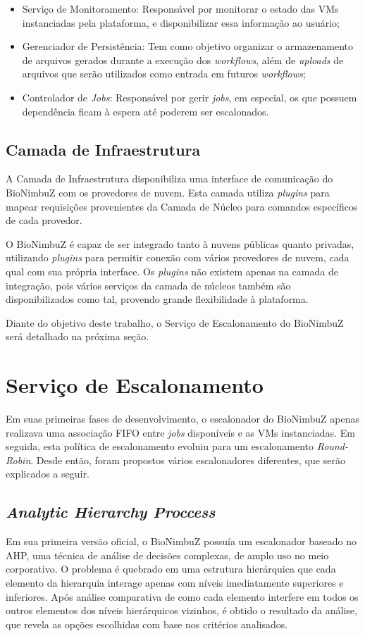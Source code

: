 \begin{itemize}
		\item Serviço de Monitoramento: Responsável por monitorar o estado das \acrshort{VM}s instanciadas pela plataforma, e disponibilizar essa informação ao usuário;
		\item Gerenciador de Persistência: Tem como objetivo organizar o armazenamento de arquivos gerados durante a execução dos \textit{workflows}, além de \textit{uploads} de arquivos que serão utilizados como entrada em futuros \textit{workflows};
		\item Controlador de \textit{Jobs}: Responsável por gerir \textit{jobs}, em especial, os que possuem dependência ficam à espera até poderem ser escalonados.

	
	\end{itemize}
	
	\subsection{Camada de Infraestrutura} A Camada de Infraestrutura disponibiliza uma interface de comunicação do BioNimbuZ com os provedores de nuvem. Esta camada utiliza \textit{plugins} para mapear requisições provenientes da Camada de Núcleo para comandos específicos de cada provedor.

O BioNimbuZ é capaz de ser integrado tanto à nuvens públicas quanto privadas, utilizando \textit{plugins} para permitir conexão com vários provedores de nuvem, cada qual com sua própria interface. Os \textit{plugins} não existem apenas na camada de integração, pois vários serviços da camada de núcleos também são disponibilizados como tal, provendo grande flexibilidade à plataforma.

Diante do objetivo deste trabalho, o Serviço de Escalonamento do BioNimbuZ será detalhado na próxima seção.

\section{Serviço de Escalonamento}

Em suas primeiras fases de desenvolvimento, o escalonador do BioNimbuZ apenas realizava uma associação \acrfull{FIFO} entre \textit{jobs} disponíveis e as \acrshort{VM}s instanciadas. Em seguida, esta política de escalonamento evoluiu para um escalonamento \textit{Round-Robin}. Desde então, foram propostos vários escalonadores diferentes, que serão explicados a seguir.

\subsection{\textit{Analytic Hierarchy Proccess}}
Em sua primeira versão oficial, o BioNimbuZ possuía um escalonador baseado no \acrfull{AHP}\cite{6732620_BioNimbuZ_ACOsched}, uma técnica de análise de decisões complexas, de amplo uso no meio corporativo. O problema é quebrado em uma estrutura hierárquica que cada elemento da hierarquia interage apenas com níveis imediatamente superiores e inferiores. Após análise comparativa de como cada elemento interfere em todos os outros elementos dos níveis hierárquicos vizinhos, é obtido o resultado da análise, que revela as opções escolhidas com base nos critérios analisados.

